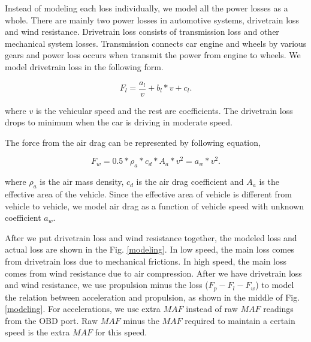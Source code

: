 
Instead of modeling each loss individually, we model all the power losses
as a whole. 
There are mainly two power losses in automotive systems, 
drivetrain loss and wind resistance. 
Drivetrain loss consists of transmission loss and other mechanical system losses.  
Transmission connects car engine and wheels by various gears and
power loss occurs when transmit the power from engine to wheels. 
We model drivetrain loss in the following form.

\begin{equation}
F_l = \frac{a_l}{v} + b_l * v + c_l. 
\end{equation}

where $v$ is the vehicular speed and the rest are coefficients. 
The drivetrain loss drops to minimum when the car is driving
in moderate speed. 


The force from the air drag \cite{andersson2012online} 
can be represented by following equation,

\begin{equation}
 F_w = 0.5 * \rho_a * c_d * A_a * v^2 = a_w * v^2.
\end{equation}

where $\rho_a$ is the air mass density, 
$c_d$ is the air drag coefficient and 
$A_a$ is the effective area of the vehicle. 
Since the effective area of vehicle is different
from vehicle to vehicle, 
we model air drag as a function of vehicle speed
with unknown coefficient $a_w$. 


After we put drivetrain loss and wind resistance together, 
the modeled loss and actual loss are shown in the Fig. \ref{modeling}. 
In low speed, the main loss comes from drivetrain loss due
to mechanical frictions. 
In high speed, the main loss comes from wind resistance due to air compression. 
After we have drivetrain loss and wind resistance, 
we use propulsion minus the loss ($F_p - F_l - F_w$) to model the relation
between acceleration and propulsion, as shown in the middle of Fig. \ref{modeling}. 
For accelerations, we use extra $MAF$ instead of raw $MAF$ readings from 
the OBD port. 
Raw $MAF$ minus the $MAF$ required to maintain a certain speed is
the extra $MAF$ for this speed. 


